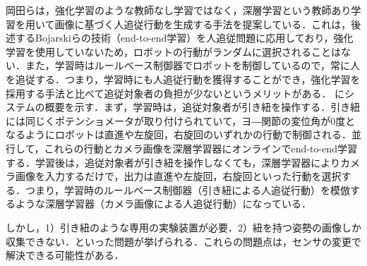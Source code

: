   岡田ら\cite{okada}は，強化学習のような教師なし学習ではなく，深層学習\cite{yann2}という教師あり学習を用いて画像に基づく人追従行動を生成する手法を提案している．これは，後述するBojarskiら\cite{bojarski}の技術（end-to-end学習）を人追従問題に応用しており，強化学習を使用していないため，ロボットの行動がランダムに選択されることはない．また，学習時はルールベース制御器でロボットを制御しているので，常に人を追従する．つまり，学習時にも人追従行動を獲得することができ，強化学習を採用する手法と比べて追従対象者の負担が少ないというメリットがある．
  にシステムの概要を示す．まず，学習時は，追従対象者が引き紐を操作する．引き紐には同じくポテンショメータが取り付けられていて，ヨ―関節の変位角が0度となるようにロボットは直進や左旋回，右旋回のいずれかの行動で制御される．並行して，これらの行動とカメラ画像を深層学習器にオンラインでend-to-end学習する．学習後は，追従対象者が引き紐を操作しなくても，深層学習器によりカメラ画像を入力するだけで，出力は直進や左旋回，右旋回といった行動を選択する．つまり，学習時のルールベース制御器（引き紐による人追従行動）を模倣するような深層学習器（カメラ画像による人追従行動）になっている．

  しかし，1）引き紐のような専用の実験装置が必要．2）紐を持つ姿勢の画像しか収集できない．といった問題が挙げられる．これらの問題点は，センサの変更で解決できる可能性がある．

\newpage

